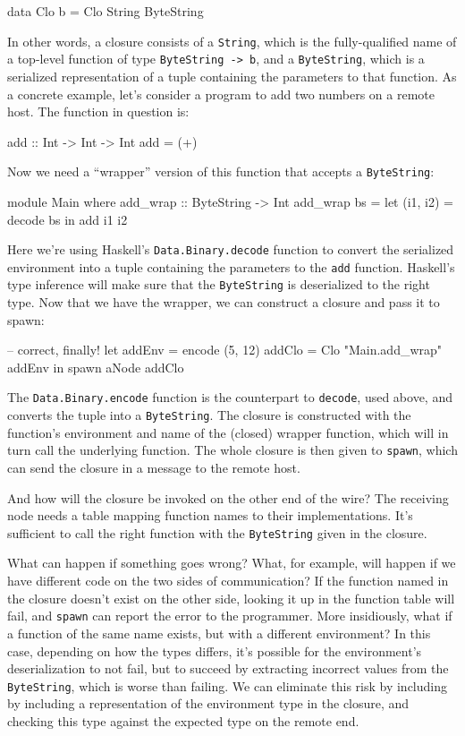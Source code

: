\documentclass[preprint]{sigplanconf}
\begin{document}
\begin{code}
data Clo b = Clo String ByteString
\end{code}

In other words, a closure consists of a \texttt{String}, which is the fully-qualified name of a top-level function of type \lstinline!ByteString -> b!, and a \texttt{ByteString}, which is a serialized representation of a tuple containing the parameters to that function. As a concrete example, let's consider a program to add two numbers on a remote host. The function in question is:

\begin{code}
add :: Int -> Int -> Int
add = (+)
\end{code}

Now we need a ``wrapper'' version of this function that accepts a \texttt{ByteString}:

\begin{code}
module Main where
add_wrap :: ByteString -> Int
add_wrap bs = let (i1, i2) = decode bs
               in add i1 i2
\end{code}

Here we're using Haskell's \texttt{Data.Binary.decode} function to convert the serialized environment into a tuple containing the parameters to the \texttt{add} function. Haskell's type inference will make sure that the \texttt{ByteString} is deserialized to the right type. Now that we have the wrapper, we can construct a closure and pass it to spawn:

\begin{code}
-- correct, finally!
let addEnv = encode (5, 12)
    addClo = Clo "Main.add_wrap" addEnv
 in spawn aNode addClo
\end{code}

The \texttt{Data.Binary.encode} function is the counterpart to \texttt{decode}, used above, and converts the tuple into a \texttt{ByteString}. The closure is constructed with the function's environment and name of the (closed) wrapper function, which will in turn call the underlying function. The whole closure is then given to \texttt{spawn}, which can send the closure in a message to the remote host.

And how will the closure be invoked on the other end of the wire? The receiving node needs a table mapping function names to their implementations. It's sufficient to call the right function with the \texttt{ByteString} given in the closure.

What can happen if something goes wrong? What, for example, will happen if we have different code on the two sides of communication? If the function named in the closure doesn't exist on the other side, looking it up in the function table will fail, and \texttt{spawn} can report the error to the programmer. More insidiously, what if a function of the same name exists, but with a different environment? In this case, depending on how the types differs, it's possible for the environment's deserialization to not fail, but to succeed by extracting incorrect values from the \texttt{ByteString}, which is worse than failing. We can eliminate this risk by including by including a representation of the environment type in the closure, and checking this type against the expected type on the remote end.
\end{document}
